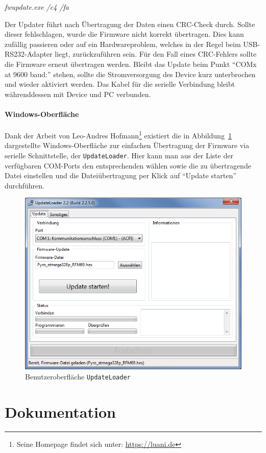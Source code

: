 \documentclass[pdftex, parskip, numbers=noenddot, toc=listof]{scrbook}
\begin{document}
				\begin{center}
					\emph{fwupdate.exe /c4 /fa}
				\end{center}

				Der Updater führt nach Übertragung der Daten einen CRC-Check durch. Sollte dieser fehlschlagen, wurde die Firmware nicht korrekt übertragen. Dies kann zufällig passieren oder auf ein Hardwareproblem, welches in der Regel beim USB-RS232-Adapter liegt, zurückzuführen sein. Für den Fall eines CRC-Fehlers sollte die Firmware erneut übertragen werden. Bleibt das Update beim Punkt \enquote{COMx at 9600 baud:} stehen, sollte die Stromversorgung des Device kurz unterbrochen und wieder aktiviert werden. Das Kabel für die serielle Verbindung bleibt währenddessen mit Device und PC verbunden.

			\subsection{Windows-Oberfläche}

				Dank der Arbeit von Leo-Andres Hofmann\footnote{Seine Homepage findet sich unter: \url{https://luani.de}} existiert die in Abbildung~\ref{fig:updateloader} dargestellte Windows-Oberfläche zur einfachen Übertragung der Firmware via serielle Schnittstelle, der \texttt{UpdateLoader}. Hier kann man aus der Liste der verfügbaren COM-Ports den entsprechenden wählen sowie die zu übertragende Datei einstellen und die Dateiübertragung per Klick auf \enquote{Update starten} durchführen.

				\begin{figure}[!h]
					\centering
					\includegraphics[width = .66\textwidth]{Bilder/updateloader.png}
					\caption{Benutzeroberfläche \texttt{UpdateLoader}}
					\label{fig:updateloader}
				\end{figure}

	\part{Dokumentation}
	\label{part:dokumentation}
\end{document}
